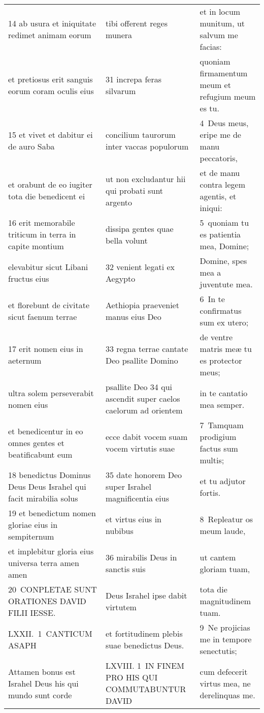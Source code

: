 \documentclass{article}
\begin{document}
\begin{longtable}{@{}p{}p{}p{}@{}}
14 ab usura et iniquitate redimet animam eorum	&	tibi offerent reges munera	&	et in locum munitum, ut salvum me facias:	\\
et pretiosus erit sanguis eorum coram oculis eius	&	31 increpa feras silvarum	&	quoniam firmamentum meum et refugium meum es tu.	\\
15 et vivet et dabitur ei de auro Saba	&	concilium taurorum inter vaccas populorum	&	4 Deus meus, eripe me de manu peccatoris,	\\
et orabunt de eo iugiter tota die benedicent ei	&	ut non excludantur hii qui probati sunt argento	&	et de manu contra legem agentis, et iniqui:	\\
16 erit memorabile triticum in terra in capite montium	&	dissipa gentes quae bella volunt	&	5 quoniam tu es patientia mea, Domine;	\\
elevabitur sicut Libani fructus eius	&	32 venient legati ex Aegypto	&	Domine, spes mea a juventute mea.	\\
et florebunt de civitate sicut faenum terrae	&	Aethiopia praeveniet manus eius Deo	&	6 In te confirmatus sum ex utero;	\\
17 erit nomen eius in aeternum	&	33 regna terrae cantate Deo psallite Domino	&	de ventre matris meæ tu es protector meus;	\\
ultra solem perseverabit nomen eius	&	psallite Deo 34 qui ascendit super caelos caelorum ad orientem	&	in te cantatio mea semper.	\\
et benedicentur in eo omnes gentes et beatificabunt eum	&	ecce dabit vocem suam vocem virtutis suae	&	7 Tamquam prodigium factus sum multis;	\\
18 benedictus Dominus Deus Deus Israhel qui facit mirabilia solus	&	35 date honorem Deo super Israhel magnificentia eius	&	et tu adjutor fortis.	\\
19 et benedictum nomen gloriae eius in sempiternum	&	et virtus eius in nubibus	&	8 Repleatur os meum laude,	\\
et implebitur gloria eius universa terra amen amen	&	36 mirabilis Deus in sanctis suis	&	ut cantem gloriam tuam,	\\
20 CONPLETAE SUNT ORATIONES DAVID FILII IESSE.	&	Deus Israhel ipse dabit virtutem	&	tota die magnitudinem tuam.	\\
LXXII. 1 CANTICUM ASAPH	&	et fortitudinem plebis suae benedictus Deus.	&	9 Ne projicias me in tempore senectutis;	\\
Attamen bonus est Israhel Deus his qui mundo sunt corde	&	LXVIII. 1 IN FINEM PRO HIS QUI COMMUTABUNTUR DAVID	&	cum defecerit virtus mea, ne derelinquas me.	\\

\end{longtable}
\end{document}
